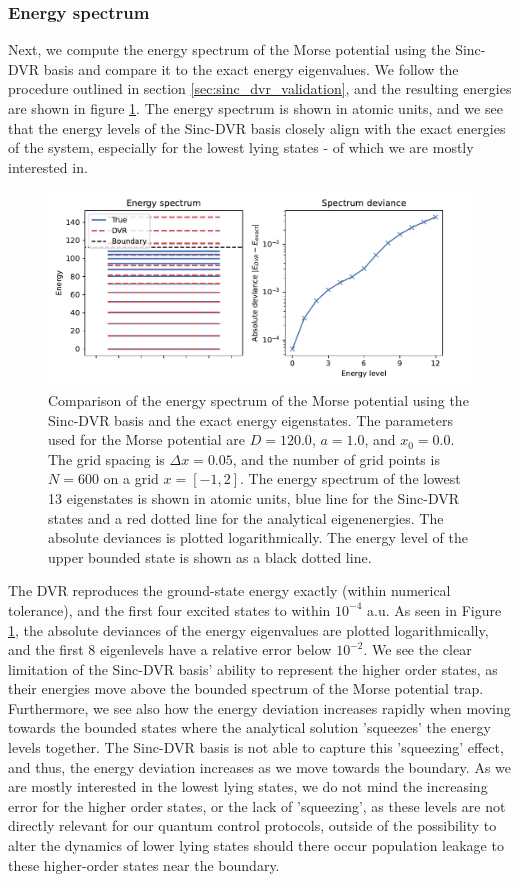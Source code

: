 \documentclass{subfiles}
\begin{document}
\subsubsection*{Energy spectrum}
Next, we compute the energy spectrum of the Morse potential using the Sinc-DVR basis and compare it to the exact energy eigenvalues. We follow the procedure outlined in section \ref{sec:sinc_dvr_validation}, and the resulting energies are shown in figure \ref{fig:dvr_validation}. The energy spectrum is shown in atomic units, and we see that the energy levels of the Sinc-DVR basis closely align with the exact energies of the system, especially for the lowest lying states - of which we are mostly interested in. 
\begin{figure}[h!]
    \centering
    \includegraphics[width=\textwidth]{figs/dvr_validation.pdf}
    \caption{Comparison of the energy spectrum of the Morse potential using the Sinc-DVR basis and the exact energy eigenstates. The parameters used for the Morse potential are $D = 120.0$, $a = 1.0$, and $x_0 = 0.0$. The grid spacing is $\Delta x = 0.05$, and the number of grid points is $N = 600$ on a grid $x=[-1, 2]$. The energy spectrum of the lowest 13 eigenstates is shown in atomic units, blue line for the Sinc-DVR states and a red dotted line for the analytical eigenenergies. The absolute deviances is plotted logarithmically. The energy level of the upper bounded state is shown as a black dotted line.}
    \label{fig:dvr_validation}
\end{figure}

The DVR reproduces the ground-state energy exactly (within numerical tolerance), and the first four excited states to within $10^{-4}$ a.u. As seen in Figure \ref{fig:dvr_validation}, the absolute deviances of the energy eigenvalues are plotted logarithmically, and the first 8 eigenlevels have a relative error below $10^{-2}$. We see the clear limitation of the Sinc-DVR basis' ability to represent the higher order states, as their energies move above the bounded spectrum of the Morse potential trap. Furthermore, we see also how the energy deviation increases rapidly when moving towards the bounded states where the analytical solution 'squeezes' the energy levels together. The Sinc-DVR basis is not able to capture this 'squeezing' effect, and thus, the energy deviation increases as we move towards the boundary. 
As we are mostly interested in the lowest lying states, we do not mind the increasing error for the higher order states, or the lack of 'squeezing', as these levels are not directly relevant for our quantum control protocols, outside of the possibility to alter the dynamics of lower lying states should there occur population leakage to these higher-order states near the boundary.
\end{document}
